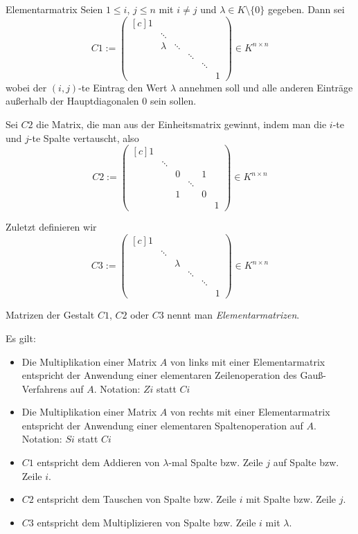 \documentclass[german]{../spicker}
\newcommand{\vektor}[1]{\begin{pmatrix*}[c] #1 \end{pmatrix*}}
\begin{document}
\begin{defi}{Elementarmatrix}
    Seien $1\leq i$, $j \leq n$ mit $i \neq j$ und $\lambda \in K \setminus \{0\}$ gegeben.
    Dann sei
    $$
        C1 := \vektor{1 & & & & \\ & \ddots & & & \\ & \lambda & \ddots & & \\ & & & \ddots & & \\ & & & & \ddots & \\ & & & & & 1} \in K^{n \times n}
    $$
    wobei der $(i, j)$-te Eintrag den Wert $\lambda$ annehmen soll und alle anderen Einträge außerhalb der Hauptdiagonalen $0$ sein sollen.

    Sei $C2$ die Matrix, die man aus der Einheitsmatrix gewinnt, indem man die $i$-te und $j$-te Spalte vertauscht, also
    $$
        C2 := \vektor{1 & & & & \\ & \ddots & & & \\ &  & 0 & &1 \\ & & & \ddots & & \\ & & 1 & & 0 & \\ & & & & & 1} \in K^{n \times n}
    $$

    Zuletzt definieren wir
    $$
        C3 := \vektor{1 & & & & \\ & \ddots & & & \\ &  & \lambda & & \\ & & & \ddots & & \\ & & & & \ddots & \\ & & & & & 1} \in K^{n \times n}
    $$

    Matrizen der Gestalt $C1$, $C2$ oder $C3$ nennt man \emph{Elementarmatrizen}.

    Es gilt:
    \begin{itemize}
        \item Die Multiplikation einer Matrix $A$ von links mit einer Elementarmatrix entspricht der Anwendung einer elementaren Zeilenoperation des Gauß-Verfahrens auf $A$.
              \subitem Notation: $Zi$ statt $Ci$
        \item Die Multiplikation einer Matrix $A$ von rechts mit einer Elementarmatrix entspricht der Anwendung einer elementaren Spaltenoperation auf $A$.
              \subitem Notation: $Si$ statt $Ci$
    \end{itemize}

    \begin{itemize}
        \item $C1$ entspricht dem Addieren von $\lambda$-mal Spalte bzw. Zeile $j$ auf Spalte bzw. Zeile $i$.
        \item $C2$ entspricht dem Tauschen von Spalte bzw. Zeile $i$ mit Spalte bzw. Zeile $j$.
        \item $C3$ entspricht dem Multiplizieren von Spalte bzw. Zeile $i$ mit $\lambda$.
    \end{itemize}
\end{defi}
\end{document}
